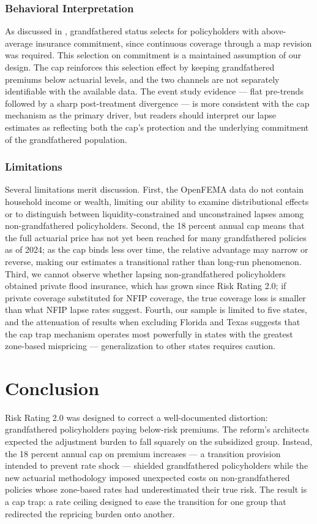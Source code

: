 \documentclass[12pt]{article}
\begin{document}
\subsubsection*{Behavioral Interpretation} As discussed in , grandfathered status selects for policyholders with above-average insurance commitment, since continuous coverage through a map revision was required. This selection on commitment is a maintained assumption of our design. The cap reinforces this selection effect by keeping grandfathered premiums below actuarial levels, and the two channels are not separately identifiable with the available data. The event study evidence --- flat pre-trends followed by a sharp post-treatment divergence --- is more consistent with the cap mechanism as the primary driver, but readers should interpret our lapse estimates as reflecting both the cap's protection and the underlying commitment of the grandfathered population.

\subsubsection*{Limitations} Several limitations merit discussion. First, the OpenFEMA data do not contain household income or wealth, limiting our ability to examine distributional effects or to distinguish between liquidity-constrained and unconstrained lapses among non-grandfathered policyholders. Second, the 18 percent annual cap means that the full actuarial price has not yet been reached for many grandfathered policies as of 2024; as the cap binds less over time, the relative advantage may narrow or reverse, making our estimates a transitional rather than long-run phenomenon. Third, we cannot observe whether lapsing non-grandfathered policyholders obtained private flood insurance, which has grown since Risk Rating 2.0; if private coverage substituted for NFIP coverage, the true coverage loss is smaller than what NFIP lapse rates suggest. Fourth, our sample is limited to five states, and the attenuation of results when excluding Florida and Texas suggests that the cap trap mechanism operates most powerfully in states with the greatest zone-based mispricing --- generalization to other states requires caution.


\section{Conclusion}
\label{sec:conclusion}

Risk Rating 2.0 was designed to correct a well-documented distortion: grandfathered policyholders paying below-risk premiums. The reform's architects expected the adjustment burden to fall squarely on the subsidized group. Instead, the 18 percent annual cap on premium increases --- a transition provision intended to prevent rate shock --- shielded grandfathered policyholders while the new actuarial methodology imposed unexpected costs on non-grandfathered policies whose zone-based rates had underestimated their true risk. The result is a cap trap: a rate ceiling designed to ease the transition for one group that redirected the repricing burden onto another.
\end{document}
